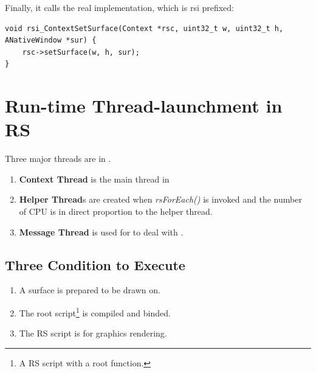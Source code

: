 Finally, it calls the real implementation, which is rsi prefixed:
\begin{lstlisting}
void rsi_ContextSetSurface(Context *rsc, uint32_t w, uint32_t h, ANativeWindow *sur) {
    rsc->setSurface(w, h, sur);
}

\end{lstlisting}

\section{Run-time Thread-launchment in RS}
\label{s:ThreadLaunch}
Three major threads are in \RS{}.
\begin{enumerate}
\item\textbf{Context Thread} is the main thread in \Core{}
\item\textbf{Helper Thread}s are created when \textit{rsForEach()} is invoked  and the number of CPU is in direct proportion to the helper thread. 
\item\textbf{Message Thread} is used for \Core{} to deal with \Client{}.
\end{enumerate}

\subsection{Three Condition to Execute}
\label{ss:ThreeCondition}
\begin{enumerate}
	\item A surface is prepared to be drawn on.
	\item The root script\footnote{A RS script with a root function.} is compiled and binded.
	\item The RS script is for graphics rendering.
\end{enumerate}





